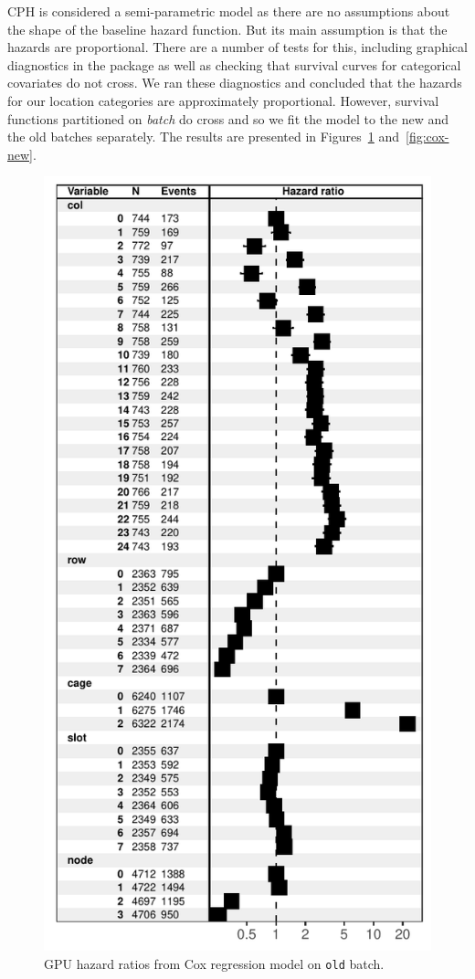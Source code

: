 CPH is considered a semi-parametric model as there are no assumptions
about the shape of the baseline hazard function. But its main
assumption is that the hazards are proportional. There are a number of
tests for this, including graphical diagnostics in the 
package as well as checking that survival curves for categorical
covariates do not cross. We ran these diagnostics and concluded that
the hazards for our location categories are approximately
proportional. However, survival functions partitioned on {\em batch}
do cross and so we fit the model to the new and the old batches
separately. The results are presented in Figures~\ref{fig:cox-old}
and~\ref{fig:cox-new}.
\begin{figure}
  \centering
  \includegraphics[width=0.8\columnwidth]{figs/cox_o001.pdf}
  \caption{GPU hazard ratios from Cox regression model on {\tt old}
    batch.}
  \label{fig:cox-old}
\end{figure}

